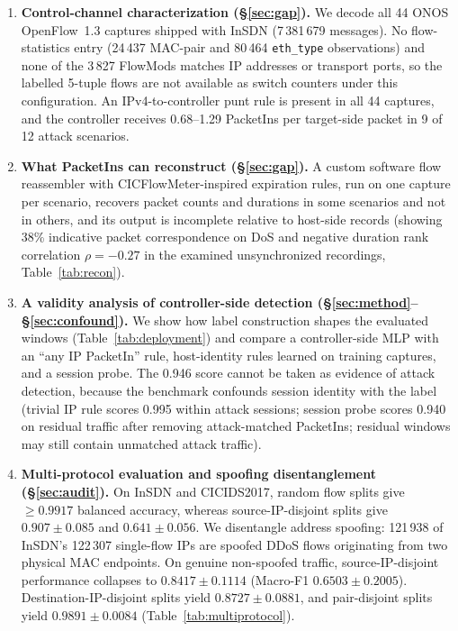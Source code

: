 \documentclass[journal]{IEEEtran}
\begin{document}
\begin{enumerate}
    \item \textbf{Control-channel characterization (\S\ref{sec:gap}).} We decode all 44 ONOS OpenFlow~1.3 captures shipped with InSDN (7\,381\,679 messages). No flow-statistics entry (24\,437 MAC-pair and 80\,464 \texttt{eth\_type} observations) and none of the 3\,827 FlowMods matches IP addresses or transport ports, so the labelled 5-tuple flows are not available as switch counters under this configuration. An IPv4-to-controller punt rule is present in all 44 captures, and the controller receives 0.68--1.29 PacketIns per target-side packet in 9 of 12 attack scenarios.
    \item \textbf{What PacketIns can reconstruct (\S\ref{sec:gap}).} A custom software flow reassembler with CICFlowMeter-inspired expiration rules, run on one capture per scenario, recovers packet counts and durations in some scenarios and not in others, and its output is incomplete relative to host-side records (showing 38\% indicative packet correspondence on DoS and negative duration rank correlation $\rho=-0.27$ in the examined unsynchronized recordings, Table~\ref{tab:recon}).
    \item \textbf{A validity analysis of controller-side detection (\S\ref{sec:method}--\S\ref{sec:confound}).} We show how label construction shapes the evaluated windows (Table~\ref{tab:deployment}) and compare a controller-side MLP with an ``any IP PacketIn'' rule, host-identity rules learned on training captures, and a session probe. The 0.946 score cannot be taken as evidence of attack detection, because the benchmark confounds session identity with the label (trivial IP rule scores 0.995 within attack sessions; session probe scores 0.940 on residual traffic after removing attack-matched PacketIns; residual windows may still contain unmatched attack traffic).
    \item \textbf{Multi-protocol evaluation and spoofing disentanglement (\S\ref{sec:audit}).} On InSDN and CICIDS2017, random flow splits give $\geq 0.9917$ balanced accuracy, whereas source-IP-disjoint splits give $0.907\pm0.085$ and $0.641\pm0.056$. We disentangle address spoofing: 121\,938 of InSDN's 122\,307 single-flow IPs are spoofed DDoS flows originating from two physical MAC endpoints. On genuine non-spoofed traffic, source-IP-disjoint performance collapses to $0.8417\pm0.1114$ (Macro-F1 $0.6503\pm0.2005$). Destination-IP-disjoint splits yield $0.8727\pm0.0881$, and pair-disjoint splits yield $0.9891\pm0.0084$ (Table~\ref{tab:multiprotocol}).

\end{enumerate}
\end{document}
